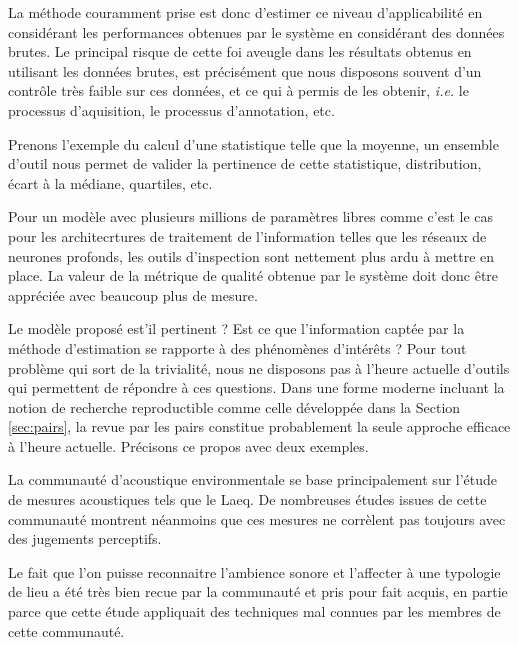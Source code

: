 La méthode couramment prise est donc d'estimer ce niveau d'applicabilité
en considérant les performances obtenues par le système en considérant des données brutes. Le principal risque de cette foi aveugle dans les résultats obtenus en utilisant les données brutes, est précisément que nous disposons souvent d'un contrôle très faible sur ces données, et ce qui à permis de les obtenir, \textit{i.e.} le processus d'aquisition, le processus d'annotation, etc.

Prenons l'exemple du calcul d'une statistique telle que la moyenne, un ensemble d'outil nous permet de valider la pertinence de cette statistique, distribution, écart à la médiane, quartiles, etc.

Pour un modèle avec plusieurs millions de paramètres libres comme c'est le cas pour les architecrtures de traitement de l'information telles que les réseaux de neurones profonds, les outils d'inspection sont nettement plus ardu à mettre en place. La valeur de la métrique de qualité obtenue par le système doit donc être appréciée avec beaucoup plus de mesure.

Le modèle proposé est'il pertinent ? Est ce que l'information captée par la méthode d'estimation se rapporte à des phénomènes d'intérêts ? Pour tout problème qui sort de la trivialité, nous ne disposons pas à l'heure actuelle d'outils qui permettent de répondre à ces questions. Dans une forme moderne incluant la notion de recherche reproductible comme celle développée dans la Section \ref{sec:pairs}, la revue par les pairs constitue probablement la seule approche efficace à l'heure actuelle. Précisons ce propos avec deux exemples.

La communauté d'acoustique environmentale se base principalement sur l'étude de mesures acoustiques tels que le Laeq. De nombreuses études issues de cette communauté montrent néanmoins que ces mesures ne corrèlent pas toujours avec des jugements perceptifs.

Le fait que l'on puisse reconnaitre l'ambience sonore et l'affecter à une typologie de lieu a été très bien recue par la communauté et pris pour fait acquis, en partie parce que cette étude appliquait des techniques mal connues par les membres de cette communauté.

